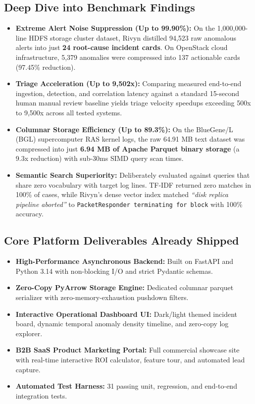 \documentclass[11pt,a4paper]{article}
\begin{document}
\subsection{Deep Dive into Benchmark Findings}
\begin{itemize}[leftmargin=*]
    \item \textbf{Extreme Alert Noise Suppression (Up to 99.90\%):} On the 1,000,000-line HDFS storage cluster dataset, Rivyn distilled 94,523 raw anomalous alerts into just \textbf{24 root-cause incident cards}. On OpenStack cloud infrastructure, 5,379 anomalies were compressed into 137 actionable cards (97.45\% reduction).
    \item \textbf{Triage Acceleration (Up to 9,502x):} Comparing measured end-to-end ingestion, detection, and correlation latency against a standard 15-second human manual review baseline yields triage velocity speedups exceeding 500x to 9,500x across all tested systems.
    \item \textbf{Columnar Storage Efficiency (Up to 89.3\%):} On the BlueGene/L (BGL) supercomputer RAS kernel logs, the raw 64.91 MB text dataset was compressed into just \textbf{6.94 MB of Apache Parquet binary storage} (a 9.3x reduction) with sub-30ms SIMD query scan times.
    \item \textbf{Semantic Search Superiority:} Deliberately evaluated against queries that share zero vocabulary with target log lines. TF-IDF returned zero matches in 100\% of cases, while Rivyn's dense vector index matched \textit{``disk replica pipeline aborted''} to \texttt{PacketResponder terminating for block} with 100\% accuracy.
\end{itemize}

\subsection{Core Platform Deliverables Already Shipped}
\begin{itemize}[leftmargin=*]
    \item \textbf{High-Performance Asynchronous Backend:} Built on FastAPI and Python 3.14 with non-blocking I/O and strict Pydantic schemas.
    \item \textbf{Zero-Copy PyArrow Storage Engine:} Dedicated columnar parquet serializer with zero-memory-exhaustion pushdown filters.
    \item \textbf{Interactive Operational Dashboard UI:} Dark/light themed incident board, dynamic temporal anomaly density timeline, and zero-copy log explorer.
    \item \textbf{B2B SaaS Product Marketing Portal:} Full commercial showcase site with real-time interactive ROI calculator, feature tour, and automated lead capture.
    \item \textbf{Automated Test Harness:} 31 passing unit, regression, and end-to-end integration tests.
\end{itemize}
\end{document}
